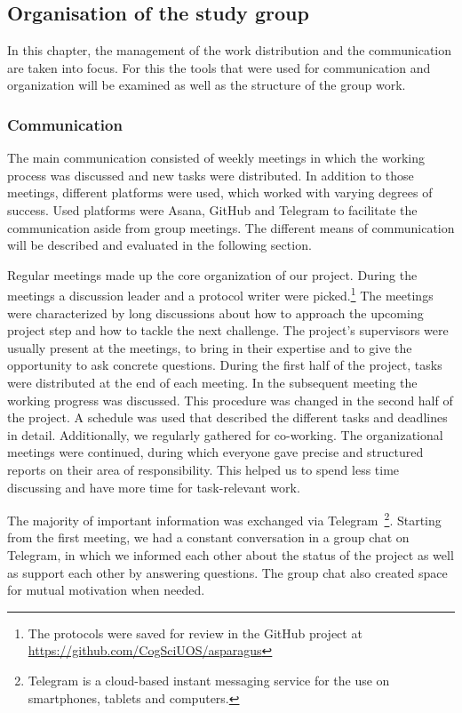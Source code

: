 \subsection{Organisation of the study group}
\label{sec:Organization}

In this chapter, the management of the work distribution and the communication are taken into focus. For this the tools that were used for communication and organization will be examined as well as the structure of the group work.


\subsubsection{Communication}
\label{subsec:Communication}

The main communication consisted of weekly meetings in which the working process was discussed and new tasks were distributed. In addition to those meetings, different platforms were used, which worked with varying degrees of success. Used platforms were Asana, GitHub and Telegram to facilitate the communication aside from group meetings. The different means of communication will be described and evaluated in the following section.

\bigskip
Regular meetings made up the core organization of our project. During the meetings a discussion leader and a protocol writer were picked.\footnote{The protocols were saved for review in the GitHub project at \\ \url{https://github.com/CogSciUOS/asparagus}} The meetings were characterized by long discussions about how to approach the upcoming project step and how to tackle the next challenge. The project’s supervisors were usually present at the meetings, to bring in their expertise and to give the opportunity to ask concrete questions. During the first half of the project, tasks were distributed at the end of each meeting. In the subsequent meeting the working progress was discussed. This procedure was changed in the second half of the project. A schedule was used that described the different tasks and deadlines in detail. Additionally, we regularly gathered for co-working. The organizational meetings were continued, during which everyone gave precise and structured reports on their area of responsibility. This helped us to spend less time discussing and have more time for task-relevant work.

The majority of important information was exchanged via Telegram~\footnote{Telegram is a cloud-based instant messaging service for the use on smartphones, tablets and computers.}.  Starting from the first meeting, we had a constant conversation in a group chat on Telegram, in which we informed each other about the status of the project as well as support each other by answering questions. The group chat also created space for mutual motivation when needed.

